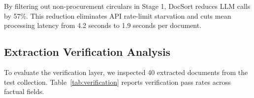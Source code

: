 \documentclass{article}
\begin{document}
\begin{table}[t]
\centering
{}
\caption{System latency and token consumption across a 100-document stream.}
\label{tab:system_savings}
\end{table}

By filtering out non-procurement circulars in Stage 1, DocSort reduces LLM calls by 57\%. This reduction eliminates API rate-limit starvation and cuts mean processing latency from 4.2 seconds to 1.9 seconds per document.

\subsection{Extraction Verification Analysis}
To evaluate the verification layer, we inspected 40 extracted documents from the test collection. Table~\ref{tab:verification} reports verification pass rates across factual fields.

\begin{table}[t]
\centering
{}
\caption{Verbatim verification results across factual fields on test documents.}
\label{tab:verification}
\end{table}
\end{document}
